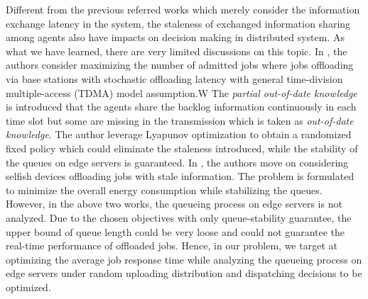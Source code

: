 Different from the previous referred works which merely consider the information exchange latency in the system, the staleness of exchanged information sharing among agents also have impacts on decision making in distributed system.
As what we have learned, there are very limited discussions on this topic.
In \cite{JSAC17-LyuX}, the authors consider maximizing the number of admitted jobs where jobs offloading via base stations with stochastic offloading latency with general time-division multiple-access (TDMA) model assumption.W
The \emph{partial out-of-date knowledge} is introduced that the agents share the backlog information continuously in each time slot but some are missing in the transmission which is taken as \emph{out-of-date knowledge}.
The author leverage Lyapunov optimization to obtain a randomized fixed policy which could eliminate the staleness introduced, while the stability of the queues on edge servers is guaranteed. 
In \cite{TWC18-LyuX}, the authors move on considering selfish devices offloading jobs with stale information.
The problem is formulated to minimize the overall energy consumption while stabilizing the queues.
However, in the above two works, the queueing process on edge servers is not analyzed.
Due to the chosen objectives with only queue-stability guarantee, the upper bound of queue length could be very loose and could not guarantee the real-time performance of offloaded jobs.
Hence, in our problem, we target at optimizing the average job response time while analyzing the queueing process on edge servers under random uploading distribution and dispatching decisions to be optimized.

